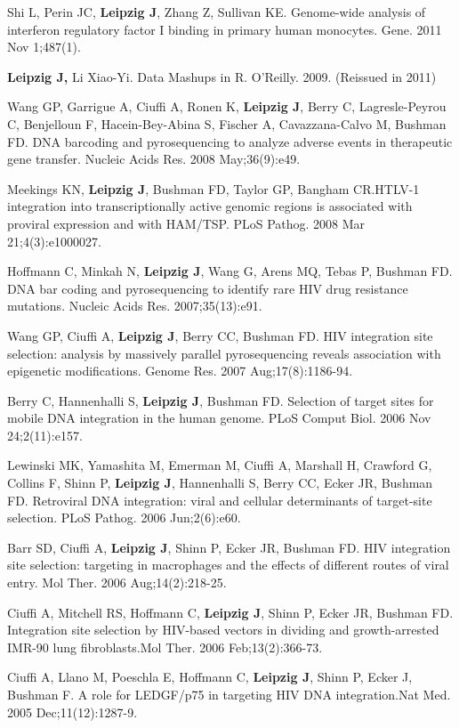 \documentclass{drexelthesis}
\begin{document}
Shi L, Perin JC, \textbf{Leipzig J}, Zhang Z, Sullivan KE. Genome-wide analysis of interferon regulatory factor I binding in primary human monocytes. Gene. 2011 Nov 1;487(1).

\textbf{Leipzig J,} Li Xiao-Yi. Data Mashups in R. O’Reilly. 2009. (Reissued in 2011)

Wang GP, Garrigue A, Ciuffi A, Ronen K, \textbf{Leipzig J}, Berry C, Lagresle-Peyrou C, Benjelloun F, Hacein-Bey-Abina S, Fischer A, Cavazzana-Calvo M, Bushman FD. DNA barcoding and pyrosequencing to analyze adverse events in therapeutic gene transfer. Nucleic Acids Res. 2008 May;36(9):e49.

Meekings KN, \textbf{Leipzig J}, Bushman FD, Taylor GP, Bangham CR.HTLV-1 integration into transcriptionally active genomic regions is associated with proviral expression and with HAM/TSP. PLoS Pathog. 2008 Mar 21;4(3):e1000027.

Hoffmann C, Minkah N, \textbf{Leipzig J}, Wang G, Arens MQ, Tebas P, Bushman FD. DNA bar coding and pyrosequencing to identify rare HIV drug resistance mutations. Nucleic Acids Res. 2007;35(13):e91.

Wang GP, Ciuffi A, \textbf{Leipzig J}, Berry CC, Bushman FD. HIV integration site selection: analysis by massively parallel pyrosequencing reveals association with epigenetic modifications. Genome Res. 2007 Aug;17(8):1186-94.

Berry C, Hannenhalli S, \textbf{Leipzig J}, Bushman FD. Selection of target sites for mobile DNA integration in the human genome. PLoS Comput Biol. 2006 Nov 24;2(11):e157.

Lewinski MK, Yamashita M, Emerman M, Ciuffi A, Marshall H, Crawford G, Collins F, Shinn P,\textbf{ Leipzig J}, Hannenhalli S, Berry CC, Ecker JR, Bushman FD. Retroviral DNA integration: viral and cellular determinants of target-site selection. PLoS Pathog. 2006 Jun;2(6):e60.

Barr SD, Ciuffi A, \textbf{Leipzig J}, Shinn P, Ecker JR, Bushman FD. HIV integration site selection: targeting in macrophages and the effects of different routes of viral entry. Mol Ther. 2006 Aug;14(2):218-25.

Ciuffi A, Mitchell RS, Hoffmann C, \textbf{Leipzig J}, Shinn P, Ecker JR, Bushman FD. Integration site selection by HIV-based vectors in dividing and growth-arrested IMR-90 lung fibroblasts.Mol Ther. 2006 Feb;13(2):366-73.

Ciuffi A, Llano M, Poeschla E, Hoffmann C, \textbf{Leipzig J}, Shinn P, Ecker J, Bushman F. A role for LEDGF/p75 in targeting HIV DNA integration.Nat Med. 2005 Dec;11(12):1287-9.
\end{document}

